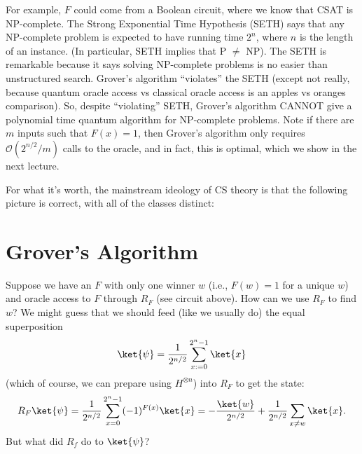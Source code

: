 \documentclass{article}
\begin{document}
For example, $F$ could come from a Boolean circuit, where we know that CSAT is NP-complete. The Strong Exponential Time Hypothesis (SETH) says that any NP-complete problem is expected to have running time $2^n$, where $n$ is the length of an instance. (In particular, SETH implies that P $\neq$ NP). The SETH is remarkable because it says solving NP-complete problems is no easier than unstructured search. Grover's algorithm ``violates'' the SETH (except not really, because quantum oracle access vs classical oracle access is an apples vs oranges comparison). So, despite ``violating'' SETH, Grover's algorithm CANNOT give a polynomial time quantum algorithm for NP-complete problems. Note if there are $m$ inputs such that $F(x)=1$, then Grover's algorithm only requires $\mathcal{O}(2^{n/2}/m)$ calls to the oracle, and in fact, this is optimal, which we show in the next lecture.

For what it's worth, the mainstream ideology of CS theory is that the following picture is correct, with all of the classes distinct:
\begin{center}
\end{center}

\section{Grover's Algorithm}

Suppose we have an $F$ with only one winner $w$ (i.e., $F(w)=1$ for a unique $w$) and oracle access to $F$ through $R_F$ (see circuit above). How can we use $R_F$ to find $w$?
We might guess that we should feed (like we usually do) the equal superposition \[\ket{\psi}= \frac{1}{2^{n/2}}\sum_{x := 0}^{2^n-1}\ket{x} \] (which of course, we can prepare using $H^{\otimes n}$) into $R_F$ to get the state: \[R_F\ket{\psi}= \frac{1}{2^{n/2}}\sum_{x = 0}^{2^n-1}(-1)^{F(x)}\ket{x} = -\frac{\ket{w}}{2^{n/2}} + \frac{1}{2^{n/2}}\sum_{x \neq w}\ket{x}.\]
But what did $R_f$ do to $\ket{\psi}$?
\end{document}
